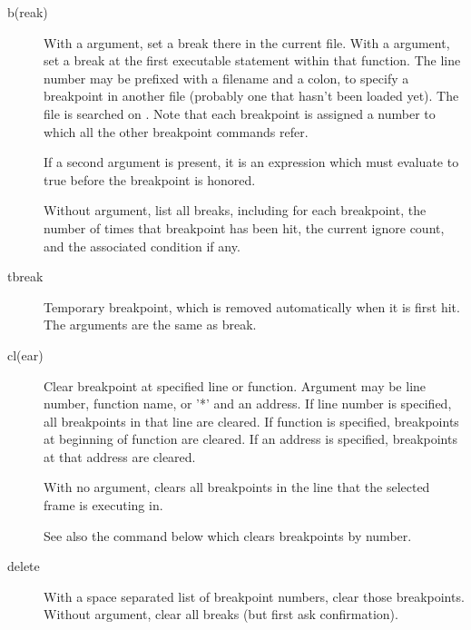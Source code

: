 \begin{description}
\item[b(reak) ]

With a  argument, set a break there in the current
file.  With a  argument, set a break at the first
executable statement within that function.
The line number may be prefixed with a filename and a colon,
to specify a breakpoint in another file (probably one that
hasn't been loaded yet).  The file is searched on .
Note that each breakpoint is assigned a number to which all the other
breakpoint commands refer.

If a second argument is present, it is an expression which must
evaluate to true before the breakpoint is honored.

Without argument, list all breaks, including for each breakpoint,
the number of times that breakpoint has been hit, the current
ignore count, and the associated condition if any.

\item[tbreak ]

Temporary breakpoint, which is removed automatically when it is
first hit.  The arguments are the same as break.

\item[cl(ear) ]

Clear breakpoint at specified line or function.  Argument may be line
number, function name, or '*' and an address.  If line number is
specified, all breakpoints in that line are cleared.  If function is
specified, breakpoints at beginning of function are cleared.  If an
address is specified, breakpoints at that address are cleared.

With no argument, clears all breakpoints in the line that the selected
frame is executing in.

See also the  command below which clears breakpoints by
number.

\item[delete ]

With a space separated list of breakpoint numbers, clear those
breakpoints.  Without argument, clear all breaks (but first
ask confirmation).


\end{description}
